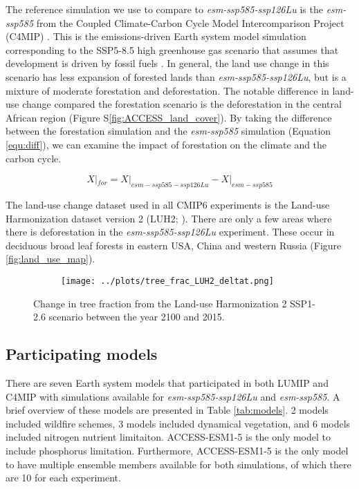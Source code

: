 \documentclass[]{article}
\begin{document}
The reference simulation we use to compare to \textit{esm-ssp585-ssp126Lu} is the \textit{esm-ssp585} from the Coupled Climate-Carbon Cycle Model Intercomparison Project (C4MIP) \parencite{jones_c4mip_2016}.
This is the emissions-driven Earth system model simulation corresponding to the SSP5-8.5 high greenhouse gas scenario that assumes that development is driven by fossil fuels \parencite{oneill_scenario_2016}.
In general, the land use change in this scenario has less expansion of forested lands than \textit{esm-ssp585-ssp126Lu}, but is a mixture of moderate forestation and deforestation.
The notable difference in land-use change compared the forestation scenario is the deforestation in the central African region (Figure S\ref{fig:ACCESS_land_cover}).
By taking the difference between the forestation simulation and the \textit{esm-ssp585} simulation (Equation \ref{equ:diff}), we can examine the impact of forestation on the climate and the carbon cycle.

\begin{equation}
    X|_{for} = X|_{esm-ssp585-ssp126Lu} - X|_{esm-ssp585}
    \label{equ:diff}
\end{equation}

The land-use change dataset used in all CMIP6 experiments is the Land-use Harmonization dataset version 2 (LUH2; \cite{hurtt_harmonization_2020}).
There are only a few areas where there is deforestation in the \textit{esm-ssp585-ssp126Lu} experiment.
These occur in deciduous broad leaf forests in eastern USA, China and western Russia (Figure \ref{fig:land_use_map}).

\begin{figure}[H]
    \centering
    \begin{subfigure}[b]{\linewidth}
        \texttt{[image: ../plots/tree\_frac\_LUH2\_deltat.png]}
    \end{subfigure}
    \caption{Change in tree fraction from the Land-use Harmonization 2 SSP1-2.6 scenario between the year 2100 and 2015.}
    \label{fig:land_use}
\end{figure}

\subsection{Participating models}

There are seven Earth system models that participated in both LUMIP and C4MIP with simulations available for \textit{esm-ssp585-ssp126Lu} and \textit{esm-ssp585}.
A brief overview of these models are presented in Table \ref{tab:models}.
2 models included wildfire schemes, 3 models included dynamical vegetation, and 6 models included nitrogen nutrient limitaiton.
ACCESS-ESM1-5 is the only model to include phosphorus limitation.
Furthermore, ACCESS-ESM1-5 is the only model to have multiple ensemble members available for both simulations, of which there are 10 for each experiment.
\end{document}

